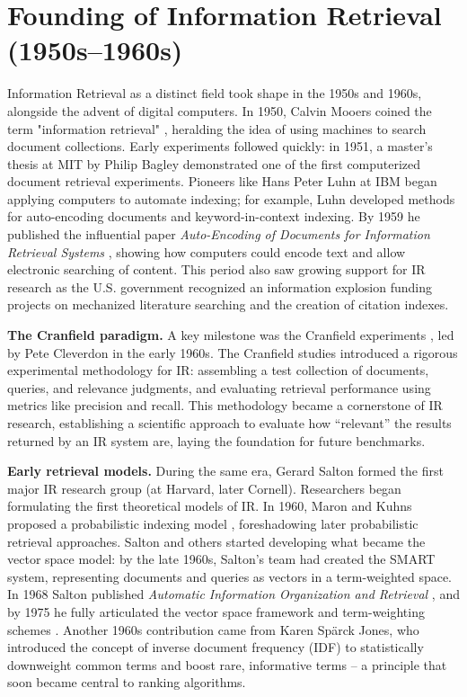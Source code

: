 \section{Founding of Information Retrieval (1950s–1960s)}
Information Retrieval as a distinct field took shape in the 1950s and 1960s, alongside the advent of digital computers. In 1950, Calvin Mooers coined the term "information retrieval" , heralding the idea of using machines to search document collections. Early experiments followed quickly: in 1951, a master’s thesis at MIT by Philip Bagley  demonstrated one of the first computerized document retrieval experiments. Pioneers like Hans Peter Luhn at IBM began applying computers to automate indexing; for example, Luhn developed methods for auto-encoding documents and keyword-in-context indexing. By 1959 he published the influential paper \emph{Auto-Encoding of Documents for Information Retrieval Systems} , showing how computers could encode text and allow electronic searching of content. This period also saw growing support for IR research as the U.S. government recognized an information explosion funding projects on mechanized literature searching and the creation of citation indexes.


\noindent\textbf{The Cranfield paradigm.}
A key milestone was the Cranfield experiments , led by Pete Cleverdon in the early 1960s. The Cranfield studies introduced a rigorous experimental methodology for IR: assembling a test collection of documents, queries, and relevance judgments, and evaluating retrieval performance using metrics like precision and recall. This methodology became a cornerstone of IR research, establishing a scientific approach to evaluate how “relevant” the results returned by an IR system are, laying the foundation for future benchmarks.


\noindent\textbf{Early retrieval models.}
During the same era, Gerard Salton formed the first major IR research group (at Harvard, later Cornell). Researchers began formulating the first theoretical models of IR. In 1960, Maron and Kuhns proposed a probabilistic indexing model , foreshadowing later probabilistic retrieval approaches. Salton and others started developing what became the vector space model: by the late 1960s, Salton’s team had created the SMART system, representing documents and queries as vectors in a term-weighted space. In 1968 Salton published \emph{Automatic Information Organization and Retrieval} , and by 1975 he fully articulated the vector space framework and term-weighting schemes . Another 1960s contribution came from Karen Spärck Jones, who introduced the concept of inverse document frequency (IDF) \cite{sparck_jones_statistical_1972} to statistically downweight common terms and boost rare, informative terms – a principle that soon became central to ranking algorithms.

